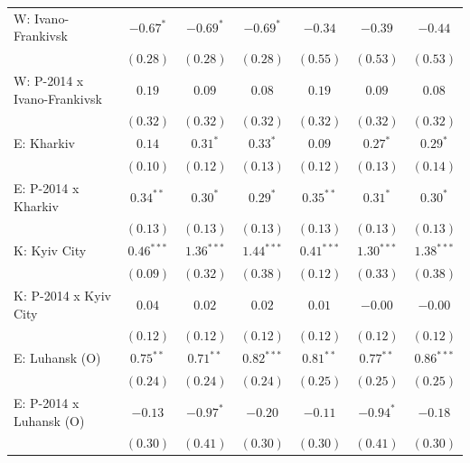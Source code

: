 \begin{table}
\begin{center}
\begin{small}
\begin{tabular}{l c c c c c c}
W: Ivano-Frankivsk          & $-0.67^{*}$   & $-0.69^{*}$   & $-0.69^{*}$   & $-0.34$      & $-0.39$      & $-0.44$      \\
                            & $(0.28)$      & $(0.28)$      & $(0.28)$      & $(0.55)$     & $(0.53)$     & $(0.53)$     \\
W: P-2014 x Ivano-Frankivsk & $0.19$        & $0.09$        & $0.08$        & $0.19$       & $0.09$       & $0.08$       \\
                            & $(0.32)$      & $(0.32)$      & $(0.32)$      & $(0.32)$     & $(0.32)$     & $(0.32)$     \\
E: Kharkiv                  & $0.14$        & $0.31^{*}$    & $0.33^{*}$    & $0.09$       & $0.27^{*}$   & $0.29^{*}$   \\
                            & $(0.10)$      & $(0.12)$      & $(0.13)$      & $(0.12)$     & $(0.13)$     & $(0.14)$     \\
E: P-2014 x Kharkiv         & $0.34^{**}$   & $0.30^{*}$    & $0.29^{*}$    & $0.35^{**}$  & $0.31^{*}$   & $0.30^{*}$   \\
                            & $(0.13)$      & $(0.13)$      & $(0.13)$      & $(0.13)$     & $(0.13)$     & $(0.13)$     \\
K: Kyiv City                & $0.46^{***}$  & $1.36^{***}$  & $1.44^{***}$  & $0.41^{***}$ & $1.30^{***}$ & $1.38^{***}$ \\
                            & $(0.09)$      & $(0.32)$      & $(0.38)$      & $(0.12)$     & $(0.33)$     & $(0.38)$     \\
K: P-2014 x Kyiv City       & $0.04$        & $0.02$        & $0.02$        & $0.01$       & $-0.00$      & $-0.00$      \\
                            & $(0.12)$      & $(0.12)$      & $(0.12)$      & $(0.12)$     & $(0.12)$     & $(0.12)$     \\
E: Luhansk (O)              & $0.75^{**}$   & $0.71^{**}$   & $0.82^{***}$  & $0.81^{**}$  & $0.77^{**}$  & $0.86^{***}$ \\
                            & $(0.24)$      & $(0.24)$      & $(0.24)$      & $(0.25)$     & $(0.25)$     & $(0.25)$     \\
E: P-2014 x Luhansk (O)     & $-0.13$       & $-0.97^{*}$   & $-0.20$       & $-0.11$      & $-0.94^{*}$  & $-0.18$      \\
                            & $(0.30)$      & $(0.41)$      & $(0.30)$      & $(0.30)$     & $(0.41)$     & $(0.30)$     \\

\end{tabular}
\end{small}
\end{center}
\end{table}
